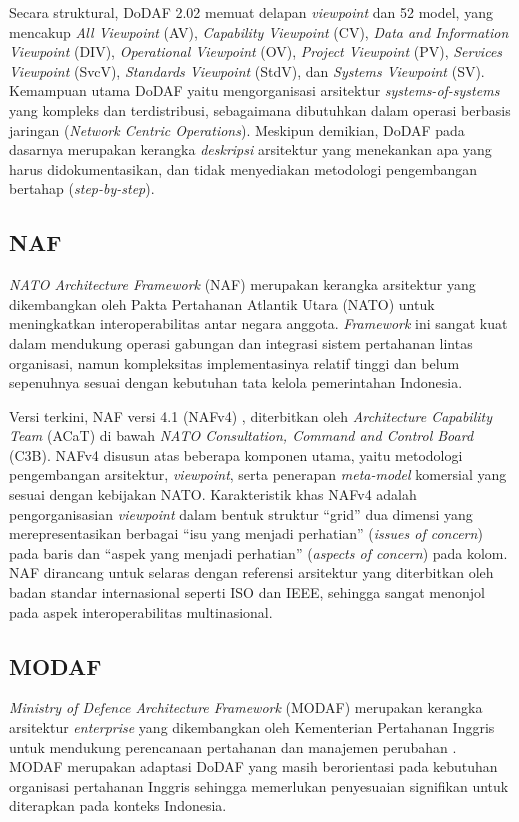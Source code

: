 Secara struktural, DoDAF 2.02 memuat delapan \textit{viewpoint} dan 52 model, yang mencakup \textit{All Viewpoint} (AV), \textit{Capability Viewpoint} (CV), \textit{Data and Information Viewpoint} (DIV), \textit{Operational Viewpoint} (OV), \textit{Project Viewpoint} (PV), \textit{Services Viewpoint} (SvcV), \textit{Standards Viewpoint} (StdV), dan \textit{Systems Viewpoint} (SV).
Kemampuan utama DoDAF yaitu mengorganisasi arsitektur \textit{systems-of-systems} yang kompleks dan terdistribusi, sebagaimana dibutuhkan dalam operasi berbasis jaringan (\textit{Network Centric Operations}).
Meskipun demikian, DoDAF pada dasarnya merupakan kerangka \textit{deskripsi} arsitektur yang menekankan apa yang harus didokumentasikan, dan tidak menyediakan metodologi pengembangan bertahap (\textit{step-by-step}).

\subsection{NAF}
\textit{NATO Architecture Framework} (NAF) merupakan kerangka arsitektur yang dikembangkan oleh Pakta Pertahanan Atlantik Utara (NATO) untuk meningkatkan interoperabilitas antar negara anggota.
\textit{Framework} ini sangat kuat dalam mendukung operasi gabungan dan integrasi sistem pertahanan lintas organisasi, namun kompleksitas implementasinya relatif tinggi dan belum sepenuhnya sesuai dengan kebutuhan tata kelola pemerintahan Indonesia.

Versi terkini, NAF versi 4.1 (NAFv4) \autocite{NAFv4}, diterbitkan oleh \textit{Architecture Capability Team} (ACaT) di bawah \textit{NATO Consultation, Command and Control Board} (C3B).
NAFv4 disusun atas beberapa komponen utama, yaitu metodologi pengembangan arsitektur, \textit{viewpoint}, serta penerapan \textit{meta-model} komersial yang sesuai dengan kebijakan NATO.
Karakteristik khas NAFv4 adalah pengorganisasian \textit{viewpoint} dalam bentuk struktur ``grid'' dua dimensi yang merepresentasikan berbagai ``isu yang menjadi perhatian'' (\textit{issues of concern}) pada baris dan ``aspek yang menjadi perhatian'' (\textit{aspects of concern}) pada kolom.
NAF dirancang untuk selaras dengan referensi arsitektur yang diterbitkan oleh badan standar internasional seperti ISO dan IEEE, sehingga sangat menonjol pada aspek interoperabilitas multinasional.

\subsection{MODAF}
\textit{Ministry of Defence Architecture Framework} (MODAF) merupakan kerangka arsitektur \textit{enterprise} yang dikembangkan oleh Kementerian Pertahanan Inggris untuk mendukung perencanaan pertahanan dan manajemen perubahan \autocite{Weilkiens2022}.
MODAF merupakan adaptasi DoDAF yang masih berorientasi pada kebutuhan organisasi pertahanan Inggris sehingga memerlukan penyesuaian signifikan untuk diterapkan pada konteks Indonesia.

